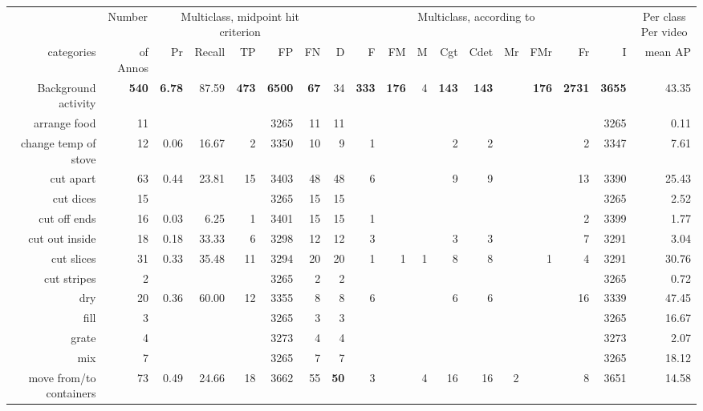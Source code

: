 \begin{tabular}{r r r@{\ \ }r@{\ \ }r@{\ \ }r@{\ \ }r r@{\ \ }r@{\ \ }r@{\ \ }r@{\ \ }r@{\ \ }r@{\ \ }r@{\ \ }r@{\ \ }r@{\ \ }r r}
\toprule  & \multicolumn{1}{c}{Number}  & \multicolumn{5}{c}{Multiclass, midpoint hit criterion}  & \multicolumn{10}{c}{Multiclass, according to~\cite{ward11tist}}  & \multicolumn{1}{c}{Per class Per video} \\
categories&of Annos&Pr&Recall&TP&FP&FN&D&F&FM&M&Cgt&Cdet&Mr&FMr&Fr&I&mean AP\\
\cmidrule(lr){1-1} \cmidrule(lr){2-2} \cmidrule(lr){3-7} \cmidrule(lr){8-17} \cmidrule(lr){18-18}
 Background activity & \textbf{540} & \textbf{6.78} & 87.59 & \textbf{473} & \textbf{6500} & \textbf{67} & 34 & \textbf{333} & \textbf{176} & 4 & \textbf{143} & \textbf{143} &  & \textbf{176} & \textbf{2731} & \textbf{3655} & 43.35 \\
arrange food & 11 &  &  &  & 3265 & 11 & 11 &  &  &  &  &  &  &  &  & 3265 & 0.11 \\
change temp of stove & 12 & 0.06 & 16.67 & 2 & 3350 & 10 & 9 & 1 &  &  & 2 & 2 &  &  & 2 & 3347 & 7.61 \\
cut apart & 63 & 0.44 & 23.81 & 15 & 3403 & 48 & 48 & 6 &  &  & 9 & 9 &  &  & 13 & 3390 & 25.43 \\
cut dices & 15 &  &  &  & 3265 & 15 & 15 &  &  &  &  &  &  &  &  & 3265 & 2.52 \\
cut off ends & 16 & 0.03 & 6.25 & 1 & 3401 & 15 & 15 & 1 &  &  &  &  &  &  & 2 & 3399 & 1.77 \\
cut out inside & 18 & 0.18 & 33.33 & 6 & 3298 & 12 & 12 & 3 &  &  & 3 & 3 &  &  & 7 & 3291 & 3.04 \\
cut slices & 31 & 0.33 & 35.48 & 11 & 3294 & 20 & 20 & 1 & 1 & 1 & 8 & 8 &  & 1 & 4 & 3291 & 30.76 \\
cut stripes & 2 &  &  &  & 3265 & 2 & 2 &  &  &  &  &  &  &  &  & 3265 & 0.72 \\
dry & 20 & 0.36 & 60.00 & 12 & 3355 & 8 & 8 & 6 &  &  & 6 & 6 &  &  & 16 & 3339 & 47.45 \\
fill & 3 &  &  &  & 3265 & 3 & 3 &  &  &  &  &  &  &  &  & 3265 & 16.67 \\
grate & 4 &  &  &  & 3273 & 4 & 4 &  &  &  &  &  &  &  &  & 3273 & 2.07 \\
mix & 7 &  &  &  & 3265 & 7 & 7 &  &  &  &  &  &  &  &  & 3265 & 18.12 \\
move from/to containers & 73 & 0.49 & 24.66 & 18 & 3662 & 55 & \textbf{50} & 3 &  & 4 & 16 & 16 & 2 &  & 8 & 3651 & 14.58 \\

\end{tabular}
